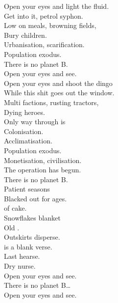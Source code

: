 
\label{album:infest-the-rats-nest}





Open your eyes and light the fluid. \\
Get into it, petrol syphon. \\
Low on meals, browning fields, \\
Bury children. \\

Urbanisation, scarification. \\
Population exodus. \\
There is no planet B. \\
Open your eyes and see. \\

Open your eyes and shoot the dingo \\
While this shit goes out the window. \\
Multi factions, rusting tractors, \\
Dying heroes. \\

Only way through is \\
Colonisation. \\
Acclimatisation. \\
Population exodus. \\
Monetisation, civilisation. \\
The operation has begun. \\
There is no planet B. \\

Patient seasons \\
Blacked out for ages. \\
 of cake. \\
Snowflakes blanket \\
Old . \\
Outskirts disperse. \\
 is a blank verse. \\
Last hearse. \\
Dry nurse. \\

Open your eyes and see. \\
There is no planet B… \\
Open your eyes and see. \\

